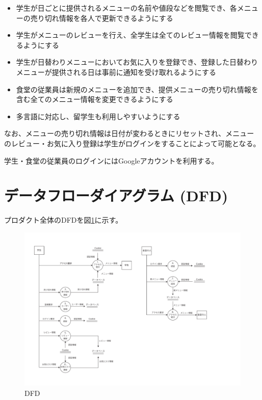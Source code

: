 \documentclass[a4paper]{jsarticle}
\begin{document}
\begin{itemize}
  \item 学生が日ごとに提供されるメニューの名前や値段などを閲覧でき、各メニューの売り切れ情報を各人で更新できるようにする
  \item 学生がメニューのレビューを行え、全学生は全てのレビュー情報を閲覧できるようにする
  \item 学生が日替わりメニューにおいてお気に入りを登録でき、登録した日替わりメニューが提供される日は事前に通知を受け取れるようにする
  \item 食堂の従業員は新規のメニューを追加でき、提供メニューの売り切れ情報を含む全てのメニュー情報を変更できるようにする
  \item 多言語に対応し、留学生も利用しやすいようにする
\end{itemize}

なお、メニューの売り切れ情報は日付が変わるときにリセットされ、メニューのレビュー・お気に入り登録は学生がログインをすることによって可能となる。

学生・食堂の従業員のログインにはGoogleアカウントを利用する。

\newpage

\section{データフローダイアグラム (DFD)}
プロダクト全体のDFDを図\ref{dfd}に示す。

\begin{figure}[htbp]
  \centering
  \includegraphics[scale=0.50]{DFD/DFD.pdf}
  \caption{DFD}
  \label{dfd}
\end{figure}
\end{document}
